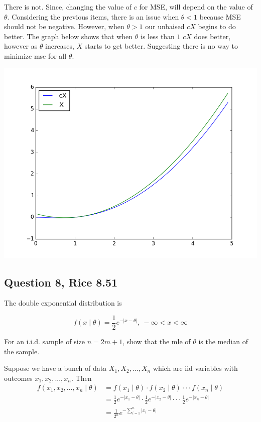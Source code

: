 \documentclass{tufte-book}
\theoremstyle{mytheoremstyle}
\theoremstyle{mylemstyle}
\theoremstyle{mydefstyle}
\begin{document}
\begin{enumerate}
There is not.  Since, changing the value of $c$ for MSE, will depend on the value of $\theta$.  Considering the previous items, there is an issue when $\theta <1$ because MSE should not be negative.  However, when $\theta>1$ our unbaised $cX$ begins to do better.  The graph below shows that when $\theta$ is less than $1$ $cX$ does better, however as $\theta$ increases, $X$ starts to get better.  Suggesting there is no way to minimize mse for all $\theta$.

\includegraphics{q7}

\end{enumerate}

\subsection{Question 8, Rice 8.51}
The double exponential distribution is

\[ f(x\mid \theta) = \frac{1}{2} e^{-|x-\theta|} , \ -\infty < x < \infty \]

For an i.i.d. sample of size $n=2m+1$, show that the mle of $\theta$ is the median of the sample.

Suppose we have a bunch of data $X_1, X_2,...,X_n$ which are iid variables with outcomes $x_1, x_2,...,x_n$.  Then
\begin{align*}
f(x_1, x_2,...,x_n \mid \theta) &= f(x_1\mid \theta)\cdot f(x_2\mid \theta)\cdot \cdot \cdot f(x_n \mid \theta)\\
&= \frac{1}{2}e^{-|x_1 - \theta|} \cdot \frac{1}{2}e^{-|x_2 - \theta|} \cdot \cdot \cdot \frac{1}{2}e^{-|x_n - \theta|}\\
&= \frac{1}{2^n} e^{-\sum_{i=1}^n|x_i -\theta|}
\end{align*}
\end{document}
